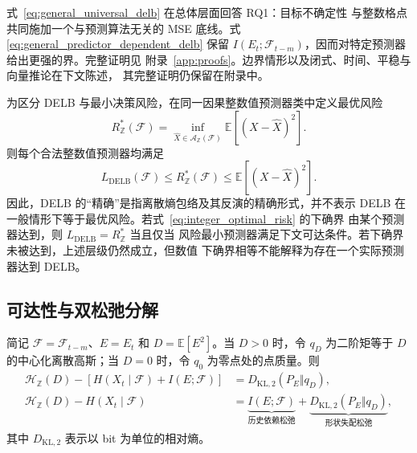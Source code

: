 式~\eqref{eq:general_universal_delb} 在总体层面回答 RQ1：目标不确定性
与整数格点共同施加一个与预测算法无关的 MSE 底线。式
\eqref{eq:general_predictor_dependent_delb} 保留
\(I(E_t;\mathcal F_{t-m})\)，因而对特定预测器给出更强的界。完整证明见
附录~\ref{app:proofs}。边界情形以及闭式、时间、平稳与向量推论在下文陈述，
其完整证明仍保留在附录中。

为区分 DELB 与最小决策风险，在同一因果整数值预测器类中定义最优风险
\begin{equation}
R_{\mathbb Z}^{*}(\mathcal F)
=
\inf_{\widehat X\in\mathcal A_{\mathbb Z}(\mathcal F)}
\mathbb E[(X-\widehat X)^2].
\label{eq:integer_optimal_risk}
\end{equation}
则每个合法整数值预测器均满足
\begin{equation}
L_{\mathrm{DELB}}(\mathcal F)
\leq
R_{\mathbb Z}^{*}(\mathcal F)
\leq
\mathbb E[(X-\widehat X)^2].
\label{eq:delb_bayes_risk_hierarchy}
\end{equation}
因此，DELB 的“精确”是指离散熵包络及其反演的精确形式，并不表示 DELB
在一般情形下等于最优风险。若式~\eqref{eq:integer_optimal_risk} 的下确界
由某个预测器达到，则 \(L_{\mathrm{DELB}}=R_{\mathbb Z}^{*}\) 当且仅当
风险最小预测器满足下文可达条件。若下确界未被达到，上述层级仍然成立，但数值
下确界相等不能解释为存在一个实际预测器达到 DELB。

\subsection{可达性与双松弛分解}
\label{subsec:attainability}

\begin{Proposition}[熵域中的精确可达性分解]
\label{prop:attainability_decomposition}
简记 \(\mathcal F=\mathcal F_{t-m}\)、\(E=E_t\) 和
\(D=\mathbb E[E^2]\)。当 \(D>0\) 时，令 \(q_D\) 为二阶矩等于 \(D\)
的中心化离散高斯；当 \(D=0\) 时，令 \(q_0\) 为零点处的点质量。则
\begin{align}
\mathcal H_{\mathbb Z}(D)
-\left[H(X_t\mid\mathcal F)+I(E;\mathcal F)\right]
&=
D_{\mathrm{KL},2}(P_E\Vert q_D),
\label{eq:predictor_attainability_decomposition}\\
\mathcal H_{\mathbb Z}(D)-H(X_t\mid\mathcal F)
&=
\underbrace{I(E;\mathcal F)}_{\text{历史依赖松弛}}
+
\underbrace{D_{\mathrm{KL},2}(P_E\Vert q_D)}_
{\text{形状失配松弛}},
\label{eq:universal_attainability_decomposition}
\end{align}
其中 \(D_{\mathrm{KL},2}\) 表示以 bit 为单位的相对熵。
\end{Proposition}

